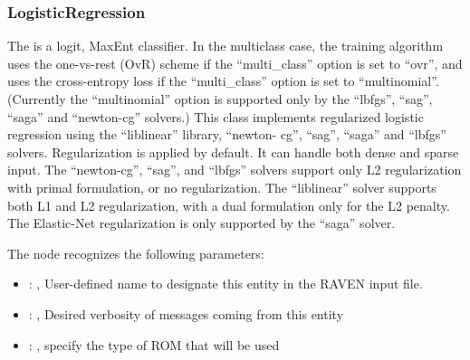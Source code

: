 \subsubsection{LogisticRegression}
  The   is                             a logit, MaxEnt classifier.
  In the multiclass case, the training algorithm uses the one-vs-rest (OvR) scheme
  if the ``multi\_class'' option is set to ``ovr'', and uses the cross-entropy loss if the
  ``multi\_class'' option is set to ``multinomial''. (Currently the ``multinomial'' option
  is supported only by the ``lbfgs'', ``sag'', ``saga'' and ``newton-cg'' solvers.)
  This class implements regularized logistic regression using the ``liblinear'' library, ``newton-
  cg'',                             ``sag'', ``saga'' and ``lbfgs'' solvers. Regularization is
  applied by default. It can handle both dense and sparse input.                             The
  ``newton-cg'', ``sag'', and ``lbfgs'' solvers support only L2 regularization with primal
  formulation,                             or no regularization. The ``liblinear'' solver supports
  both L1 and L2 regularization, with a dual formulation                             only for the L2
  penalty. The Elastic-Net regularization is only supported by the ``saga'' solver.

  The  node recognizes the following parameters:
    \begin{itemize}
      \item {}: , 
        User-defined name to designate this entity in the RAVEN input file.
      \item {}: , 
        Desired verbosity of messages coming from this entity
      \item {}: , 
        specify the type of ROM that will be used
  \end{itemize}


